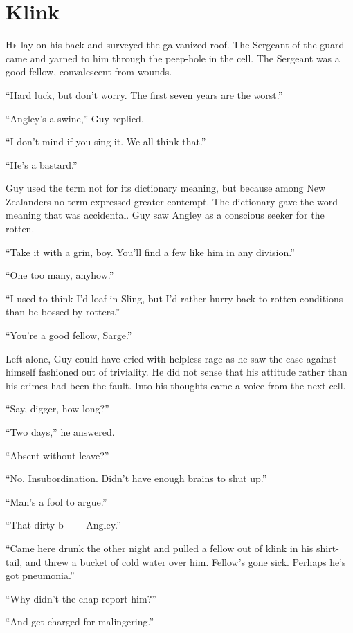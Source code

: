 \chapter*{\textsf{Klink}}

H\textsc{e} lay on his back and surveyed the galvanized roof. The 
Sergeant of the guard came and yarned to him through the peep-hole 
in the cell. The Sergeant was a good fellow, convalescent from 
wounds.

``Hard luck, but don't worry. The first seven years are the worst.''

``Angley's a swine,'' Guy replied.

``I don't mind if you sing it. We all think that.''

``He's a bastard.''

Guy used the term not for its dictionary meaning, but because 
among New Zealanders no term expressed greater contempt. The 
dictionary gave the word meaning that was accidental. Guy saw 
Angley as a conscious seeker for the rotten.

``Take it with a grin, boy. You'll find a few like him in any 
division.''

``One too many, anyhow.''

``I used to think I'd loaf in Sling, but I'd rather hurry back 
to rotten conditions than be bossed by rotters.''

``You're a good fellow, Sarge.''

Left alone, Guy could have cried with helpless rage as he saw 
the case against himself fashioned out of triviality. He did not 
sense that his attitude rather than his crimes had been the fault. 
Into his thoughts came a voice from the next cell.

``Say, digger, how long?''

``Two days,'' he answered.

``Absent without leave?''

``No. Insubordination. Didn't have enough brains to shut up.''

``Man's a fool to argue.''

``That dirty b------ Angley.''

``Came here drunk the other night and pulled a fellow out of 
klink in his shirt-tail, and threw a bucket of cold water over 
him. Fellow's gone sick. Perhaps he's got pneumonia.''

``Why didn't the chap report him?''

``And get charged for malingering.''

